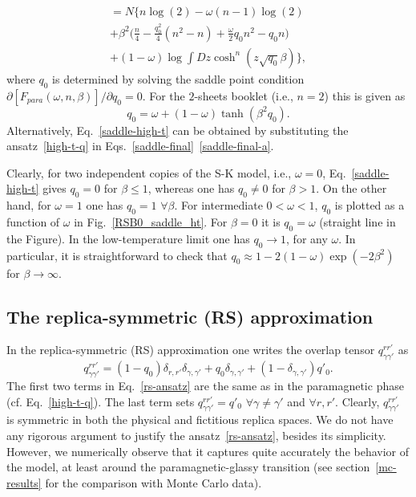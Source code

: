 \documentclass[twocolumn,superscriptaddress,prb,10pt]{revtex4-1}
\begin{document}
%
\begin{multline}
[F_{para}(\omega,n,\beta)]=N\Big\{
n\log(2)-\omega(n-1)\log(2)\\+
\beta^2\Big(\frac{n}{4}-\frac{q_0^2}{4}(n^2-n)
+\frac{\omega}{2}q_0n^2-q_0n\Big)\\
+(1-\omega)\log\int Dz\cosh^n(z\sqrt{q_0}\beta)
\Big\},
\label{ht-logZ}
\end{multline}
%
where $q_0$ is determined by solving the saddle point condition $\partial[F_{para}
(\omega,n,\beta)]/\partial q_0=0$. For the $2$-sheets booklet (i.e., $n=2$) this is  
given as   
%
\begin{equation}
q_0=\omega+(1-\omega)\tanh(\beta^2 q_0).
\label{saddle-high-t}
\end{equation}
%
Alternatively, Eq.~\eqref{saddle-high-t} can be obtained by substituting the 
ansatz~\eqref{high-t-q} in Eqs.~\eqref{saddle-final}~\eqref{saddle-final-a}. 

Clearly, for two independent copies of the S-K model, i.e., $\omega=0$,  
Eq.~\eqref{saddle-high-t} gives $q_0=0$ for $\beta\le1$, whereas 
one has $q_0\ne0$ for $\beta>1$. On the other hand, for $\omega=1$ 
one has $q_0=1$ $\forall\beta$. For intermediate $0<\omega<1$, $q_0$ 
is plotted as a function of $\omega$ in Fig.~\ref{RSB0_saddle_ht}. For $\beta=0$ it 
is $q_0=\omega$ (straight line in the Figure). In the low-temperature limit 
one has $q_0\to 1$, for any $\omega$. In particular, it is straightforward 
to check that  $q_0\approx 1-2(1-\omega)\exp(-2\beta^2)$ for $\beta\to\infty$. 


\subsection{The replica-symmetric (RS) approximation} 
\label{rs-section}

In the replica-symmetric (RS) approximation one writes the overlap tensor  
$q_{\gamma\gamma'}^{rr'}$ as
%
\begin{equation}
q_{\gamma\gamma'}^{rr'}=(1-q_0)\delta_{r,r'}\delta_{\gamma,\gamma'}+
q_0\delta_{\gamma,\gamma'}+(1-\delta_{\gamma,\gamma'})q'_0.
\label{rs-ansatz}
\end{equation}
%
The first two terms in Eq.~\eqref{rs-ansatz} are the same as in the paramagnetic 
phase (cf. Eq.~\eqref{high-t-q}). The last term sets $q_{\gamma\gamma'}^{rr'}=q'_0$ 
$\forall\gamma\ne\gamma'$ and $\forall r,r'$. Clearly, $q_{\gamma\gamma'}^{rr'}$ is 
symmetric in both the physical and fictitious replica spaces. We do not have any 
rigorous argument to justify the ansatz~\eqref{rs-ansatz}, besides its simplicity. 
However, we numerically observe that it captures quite accurately the behavior of 
the model, at least around the paramagnetic-glassy transition (see section~\ref{mc-results} 
for the comparison with Monte Carlo data). 
\end{document}
